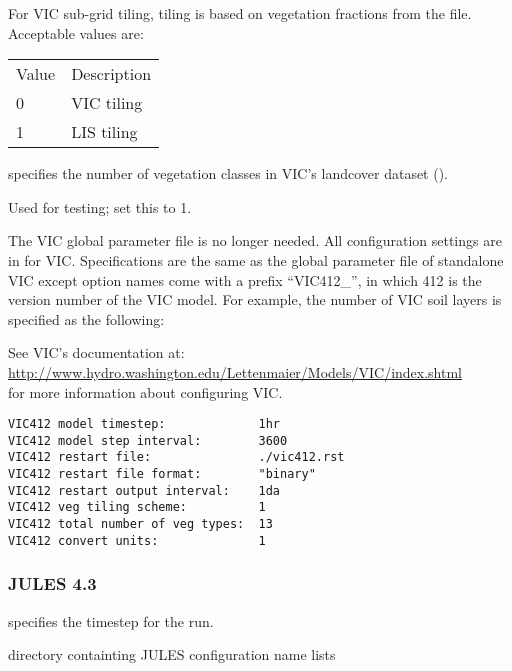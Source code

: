  For VIC sub-grid tiling, tiling is based on vegetation fractions
 from the  file.
 Acceptable values are:

 \begin{tabular}{ll}
 Value & Description \\
 0     & VIC tiling  \\
 1     & LIS tiling  \\
 \end{tabular}

  specifies the
 number of vegetation classes in VIC's landcover dataset
 ().

  Used for testing; set this to 1.

 The VIC global parameter file is no longer needed. All configuration
 settings are in  for VIC. Specifications are the same
 as the global parameter file of standalone VIC except option names
 come with a prefix ``VIC412\_'', in which 412 is the version number
 of the VIC model. For example, the number of VIC soil layers is
 specified as the following:


 See VIC's documentation at: \\
 \hyperref{http://www.hydro.washington.edu/Lettenmaier/Models/VIC/index.shtml}{}{}{http://www.hydro.washington.edu/Lettenmaier/Models/VIC/index.shtml} \\
 for more information about configuring VIC.
 

 \begin{Verbatim}[frame=single]
VIC412 model timestep:             1hr
VIC412 model step interval:        3600
VIC412 restart file:               ./vic412.rst
VIC412 restart file format:        "binary"
VIC412 restart output interval:    1da
VIC412 veg tiling scheme:          1
VIC412 total number of veg types:  13
VIC412 convert units:              1
 \end{Verbatim}


 
 
 \subsubsection{JULES 4.3} \label{sssec:lsm_jules43}
 
 
  specifies the timestep for the run.

  directory containting JULES configuration name lists 

